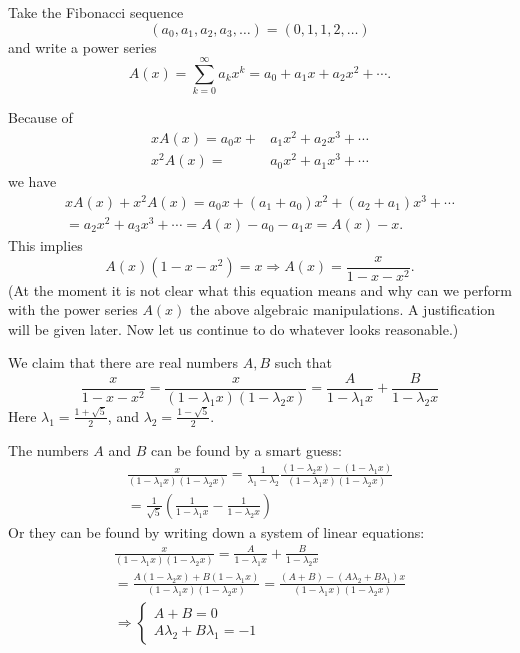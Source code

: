 

\setcounter{section}{2}
\setcounter{subsection}{1}
\setcounter{dfn}{0}

\label{sec:FibAgain}
Take the Fibonacci sequence
\[
(a_0, a_1, a_2, a_3, \ldots) = (0, 1, 1, 2, \ldots)
\]
and write a power series
\[
A(x) = \sum_{k=0}^\infty a_k x^k = a_0 + a_1 x + a_2 x^2 + \cdots.
\]

Because of
\begin{align*}
xA(x)  = a_0x + & a_1x^2 + a_2x^3 + \cdots\\
x^2A(x)  = & a_0x^2 + a_1x^3 + \cdots
\end{align*}
we have
\begin{multline*}
xA(x) + x^2A(x) = a_0 x + (a_1+a_0)x^2 + (a_2+a_1)x^3 + \cdots\\
= a_2x^2 + a_3x^3 + \cdots = A(x) - a_0 - a_1 x = A(x) - x.
\end{multline*}
This implies
\[
A(x)(1-x-x^2) = x \Rightarrow A(x) = \frac{x}{1-x-x^2}.
\]
(At the moment it is not clear what this equation means and why can we perform with the power series $A(x)$ the above algebraic manipulations.
A justification will be given later. Now let us continue to do whatever looks reasonable.)

We claim that there are real numbers $A, B$ such that
\[
\frac{x}{1-x-x^2} = \frac{x}{(1-\lambda_1x)(1-\lambda_2x)} = \frac{A}{1-\lambda_1x} + \frac{B}{1-\lambda_2x}
\]
Here $\lambda_1 = \frac{1+\sqrt{5}}2$, and $\lambda_2 = \frac{1-\sqrt{5}}2$.

The numbers $A$ and $B$ can be found by a smart guess:
\begin{multline*}
\frac{x}{(1-\lambda_1x)(1-\lambda_2x)} =
\frac{1}{\lambda_1 - \lambda_2} \frac{(1-\lambda_2x) - (1-\lambda_1x)}{(1-\lambda_1x)(1-\lambda_2x)}\\
= \frac{1}{\sqrt{5}} \left( \frac{1}{1-\lambda_1x} - \frac{1}{1-\lambda_2x} \right)
\end{multline*}
Or they can be found by writing down a system of linear equations:
\begin{multline*}
\frac{x}{(1-\lambda_1x)(1-\lambda_2x)} = \frac{A}{1-\lambda_1x} + \frac{B}{1-\lambda_2x}\\
= \frac{A(1-\lambda_2x) + B(1-\lambda_1x)}{(1-\lambda_1x)(1-\lambda_2x)}
= \frac{(A+B) - (A\lambda_2 + B\lambda_1)x}{(1-\lambda_1x)(1-\lambda_2x)}\\
\Rightarrow \begin{cases} A+B = 0\\ A\lambda_2 + B\lambda_1 = -1 \end{cases}
\end{multline*}

